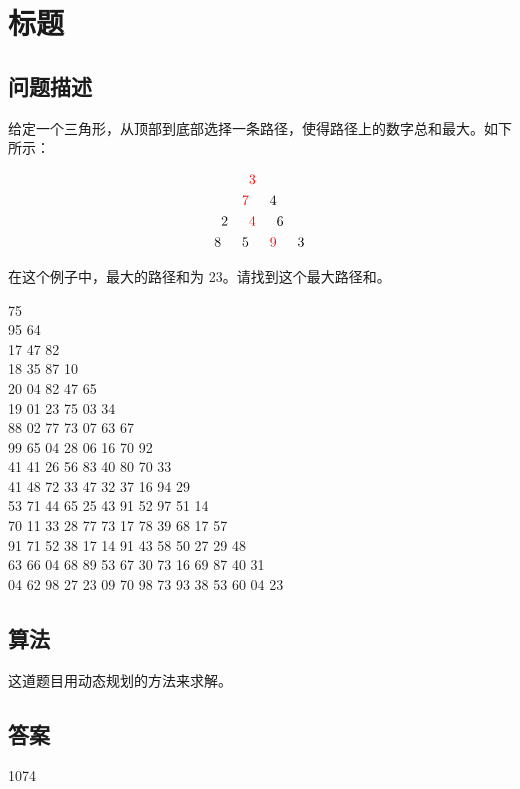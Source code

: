 \section{标题}
\subsection{问题描述}
\begin{tcolorbox}
	给定一个三角形，从顶部到底部选择一条路径，使得路径上的数字总和最大。如下所示：

	\[
		\begin{aligned}
			  &   &                    & \textcolor{red}{3} &                    &   &   \\
			  &   & \textcolor{red}{7} &                    & 4                  &   &   \\
			  & 2 &                    & \textcolor{red}{4} &                    & 6 &   \\
			8 &   & 5                  &                    & \textcolor{red}{9} &   & 3
		\end{aligned}
	\]

	在这个例子中，最大的路径和为 23。请找到这个最大路径和。

	\begin{center}
		75\\
		95 64\\
		17 47 82\\
		18 35 87 10\\
		20 04 82 47 65\\
		19 01 23 75 03 34\\
		88 02 77 73 07 63 67\\
		99 65 04 28 06 16 70 92\\
		41 41 26 56 83 40 80 70 33\\
		41 48 72 33 47 32 37 16 94 29\\
		53 71 44 65 25 43 91 52 97 51 14\\
		70 11 33 28 77 73 17 78 39 68 17 57\\
		91 71 52 38 17 14 91 43 58 50 27 29 48\\
		63 66 04 68 89 53 67 30 73 16 69 87 40 31\\
		04 62 98 27 23 09 70 98 73 93 38 53 60 04 23\\
	\end{center}
\end{tcolorbox}

\subsection{算法}
这道题目用动态规划的方法来求解。

\subsection{答案}
1074
